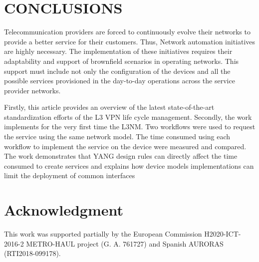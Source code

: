 \documentclass[conference]{IEEEtran}
\begin{document}
\section{CONCLUSIONS}
\label{sect:conclu}

Telecommunication providers are forced to continuously evolve their networks to provide a better service for their customers. Thus, Network automation initiatives are highly necessary.  The implementation of these initiatives requires their adaptability and support of brownfield scenarios in operating networks. This support must include not only the configuration of the devices and all the possible services provisioned in the day-to-day operations across the service provider networks. 

Firstly, this article provides an overview of the latest state-of-the-art standardization efforts of the L3 VPN life cycle management. Secondly, the work implements for the very first time the L3NM. Two workflows were used to request the service using the same network model. The time consumed using each workflow to implement the service on the device were measured and compared. The work demonstrates that YANG design rules can directly affect the time consumed to create services and explains how device models implementations can limit the deployment of common interfaces

\section*{Acknowledgment}
This work was supported partially by the European Commission H2020-ICT-2016-2 METRO-HAUL project (G. A. 761727) and Spanish AURORAS (RTI2018-099178).



\end{document}
